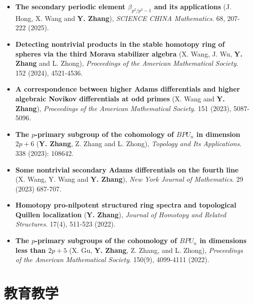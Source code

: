 \documentclass[12pt,a4paper,sans,fontset=windows]{moderncv} %
\begin{document}
\begin{itemize}[wide=30pt, leftmargin=*]
    \item \textbf{The secondary periodic element $\beta_{p^2/p^2-1}$ and its applications}
        \newline (J. Hong, X. Wang and \textbf{Y. Zhang}), \textit{SCIENCE CHINA Mathematics}. 68, 207-222 (2025).
    \item \textbf{Detecting nontrivial products in the stable homotopy ring of spheres via the third Morava stabilizer algebra}
    \newline (X. Wang, J. Wu, \textbf{Y. Zhang} and L. Zhong), \textit{Proceedings of the American Mathematical Society}. 152 (2024), 4521-4536.
    \item \textbf{A correspondence between higher Adams differentials and higher algebraic Novikov differentials at odd primes}
        \newline (X. Wang and \textbf{Y. Zhang}), \textit{Proceedings of the American Mathematical Society}. 151 (2023), 5087-5096.
    \item \textbf{The $p$-primary subgroup of the cohomology of $BPU_n$ in dimension $2p+6$}
        \newline (\textbf{Y. Zhang}, Z. Zhang and L. Zhong), \textit{Topology and Its Applications}.  338 (2023): 108642.
    \item \textbf{Some nontrivial secondary Adams differentials on the fourth line}
        \newline (X. Wang, Y. Wang and \textbf{Y. Zhang}),  \textit{New York Journal of Mathematics}.  29 (2023) 687-707.
    \item \textbf{Homotopy pro-nilpotent structured ring spectra and topological Quillen localization}
        \newline (\textbf{Y. Zhang}), \textit{Journal of Homotopy and Related Structures}. 17(4), 511-523 (2022).
    \item \textbf{The $p$-primary subgroups of the cohomology of $BPU_n$ in dimensions less than $2p+5$}
        \newline (X. Gu, \textbf{Y. Zhang}, Z. Zhang, and L. Zhong), \textit{Proceedings of the American Mathematical Society}. 150(9), 4099-4111 (2022).         
\end{itemize}

\vspace{2pt} 


\section{教育教学}
\end{document}
